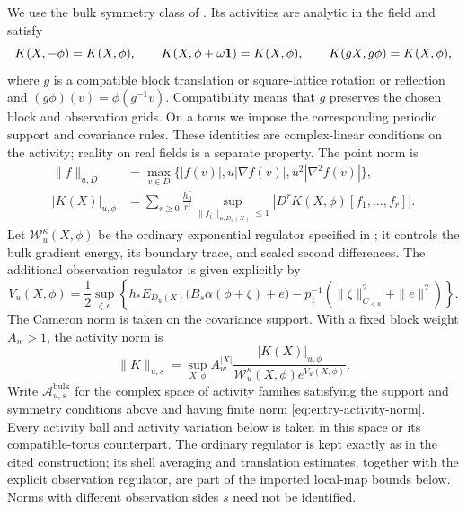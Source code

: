 We use the bulk symmetry class of \cite[Theorem~4.6(i)]{F}.
Its activities are analytic in the field and satisfy
\begin{equation}\label{eq:bulk-activity-symmetries}
 K(X,-\phi)=K(X,\phi),\qquad
 K(X,\phi+\omega\mathbf 1)=K(X,\phi),\qquad
 K(gX,g\phi)=K(X,\phi),
\end{equation}
where $g$ is a compatible block translation or square-lattice rotation
or reflection and $(g\phi)(v)=\phi(g^{-1}v)$.  Compatibility means
that $g$ preserves the chosen block and observation grids.  On a torus
we impose the corresponding periodic support and covariance rules.
These identities are complex-linear conditions on the activity;
reality on real fields is a separate property.  The point norm is
\begin{equation}\label{eq:entry-point-norm}
 \begin{split}
 \|f\|_{u,D}&=\max_{v\in D}\{|f(v)|,u|\nabla f(v)|,
                                           u^2|\nabla^2f(v)|\},\\
 |K(X)|_{u,\phi}
 &=\sum_{r\ge0}\frac{h_0^r}{r!}
   \sup_{\|f_i\|_{u,D_u(X)}\le1}
       |D^rK(X,\phi)[f_1,\ldots,f_r]|.
 \end{split}
\end{equation}
Let $\mathscr W_u^\kappa(X,\phi)$ be the ordinary exponential regulator
specified in \cite[Section~4.2, Equations~(41)--(43)]{F}; it controls the bulk gradient energy,
its boundary trace, and scaled second differences.  The additional
observation regulator is given explicitly by
\begin{equation}\label{eq:entry-observation-regulator}
 V_u(X,\phi)=\frac12\sup_{\zeta,e}
 \left\{h_*E_{D_u(X)}\bigl(B_s\alpha(\phi+\zeta)+e\bigr)
       -p_1^{-1}(\|\zeta\|_{C_{<u}}^2+\|e\|^2)\right\}.
\end{equation}
The Cameron norm is taken on the covariance support.  With a fixed block
weight $A_w>1$, the activity norm is
\begin{equation}\label{eq:entry-activity-norm}
 \|K\|_{u,s}=\sup_{X,\phi}
 A_w^{|X|}\frac{|K(X)|_{u,\phi}}
                  {\mathscr W_u^\kappa(X,\phi)e^{V_u(X,\phi)}}.
\end{equation}
Write $\mathscr A^{\mathrm{bulk}}_{u,s}$ for the complex space of
activity families satisfying the support and symmetry conditions above
and having finite norm \eqref{eq:entry-activity-norm}.  Every activity
ball and activity variation below is taken in this space or its
compatible-torus counterpart.  The ordinary regulator is kept exactly
as in the cited construction; its shell averaging and translation estimates, together with the
explicit observation regulator, are part of the imported local-map
bounds below.  Norms with different observation sides $s$ need not be
identified.

